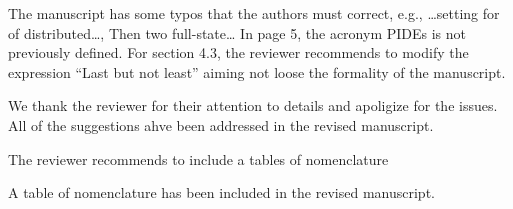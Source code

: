 \documentclass[12pt,answers]{exam}
\begin{document}
\begin{questions}
    \question The manuscript has some typos that the authors must correct, e.g., …setting for of distributed…, Then two full-state… In page 5, the acronym PIDEs is not previously defined. For section 4.3, the reviewer recommends to modify the expression “Last but not least” aiming not loose the formality of the manuscript.

    \begin{solutionorbox} \label{comment:}
        We thank the reviewer for their attention to details and apoligize for the issues. All of the suggestions ahve been addressed in the revised manuscript.
    \end{solutionorbox}


    \question The reviewer recommends to include a tables of nomenclature

    \begin{solutionorbox} \label{comment:}
        A table of nomenclature has been included in the revised manuscript.
    \end{solutionorbox}
\end{questions}


\newpage


\end{document}
